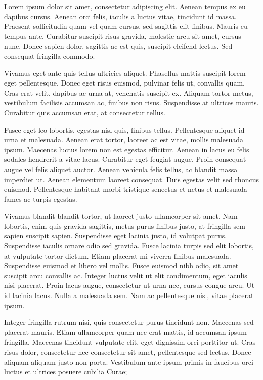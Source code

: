 Lorem ipsum dolor sit amet, consectetur adipiscing elit. Aenean tempus ex eu dapibus cursus. Aenean orci felis, iaculis a luctus vitae, tincidunt id massa. Praesent sollicitudin quam vel quam cursus, sed sagittis elit finibus. Mauris eu tempus ante. Curabitur suscipit risus gravida, molestie arcu sit amet, cursus nunc. Donec sapien dolor, sagittis ac est quis, suscipit eleifend lectus. Sed consequat fringilla commodo.

Vivamus eget ante quis tellus ultricies aliquet. Phasellus mattis suscipit lorem eget pellentesque. Donec eget risus euismod, pulvinar felis ut, convallis quam. Cras erat velit, dapibus ac urna at, venenatis suscipit ex. Aliquam tortor metus, vestibulum facilisis accumsan ac, finibus non risus. Suspendisse at ultrices mauris. Curabitur quis accumsan erat, at consectetur tellus.

Fusce eget leo lobortis, egestas nisl quis, finibus tellus. Pellentesque aliquet id urna et malesuada. Aenean erat tortor, laoreet ac est vitae, mollis malesuada ipsum. Maecenas luctus lorem non est egestas efficitur. Aenean in lacus eu felis sodales hendrerit a vitae lacus. Curabitur eget feugiat augue. Proin consequat augue vel felis aliquet auctor. Aenean vehicula felis tellus, ac blandit massa imperdiet ut. Aenean elementum laoreet consequat. Duis egestas velit sed rhoncus euismod. Pellentesque habitant morbi tristique senectus et netus et malesuada fames ac turpis egestas.

Vivamus blandit blandit tortor, ut laoreet justo ullamcorper sit amet. Nam lobortis, enim quis gravida sagittis, metus purus finibus justo, at fringilla sem sapien suscipit sapien. Suspendisse eget lacinia justo, id volutpat purus. Suspendisse iaculis ornare odio sed gravida. Fusce lacinia turpis sed elit lobortis, at vulputate tortor dictum. Etiam placerat mi viverra finibus malesuada. Suspendisse euismod et libero vel mollis. Fusce euismod nibh odio, sit amet suscipit arcu convallis ac. Integer luctus velit ut elit condimentum, eget iaculis nisi placerat. Proin lacus augue, consectetur ut urna nec, cursus congue arcu. Ut id lacinia lacus. Nulla a malesuada sem. Nam ac pellentesque nisl, vitae placerat ipsum.

Integer fringilla rutrum nisi, quis consectetur purus tincidunt non. Maecenas sed placerat mauris. Etiam ullamcorper quam nec erat mattis, id accumsan ipsum fringilla. Maecenas tincidunt vulputate elit, eget dignissim orci porttitor ut. Cras risus dolor, consectetur nec consectetur sit amet, pellentesque sed lectus. Donec aliquam aliquam justo non porta. Vestibulum ante ipsum primis in faucibus orci luctus et ultrices posuere cubilia Curae;

